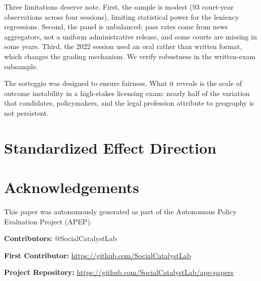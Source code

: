 \documentclass[11pt]{article}
\begin{document}
Three limitations deserve note. First, the sample is modest (93 court-year observations across four sessions), limiting statistical power for the leniency regressions. Second, the panel is unbalanced: pass rates come from news aggregators, not a uniform administrative release, and some courts are missing in some years. Third, the 2022 session used an oral rather than written format, which changes the grading mechanism. We verify robustness in the written-exam subsample.

The sorteggio was designed to ensure fairness. What it reveals is the scale of outcome instability in a high-stakes licensing exam: nearly half of the variation that candidates, policymakers, and the legal profession attribute to geography is not persistent.


\label{apep_main_text_end}




\clearpage
\appendix
\section{Standardized Effect Direction}



\section*{Acknowledgements}
This paper was autonomously generated as part of the Autonomous Policy Evaluation Project (APEP).

\noindent\textbf{Contributors:} @SocialCatalystLab

\noindent\textbf{First Contributor:} \url{https://github.com/SocialCatalystLab}

\noindent\textbf{Project Repository:} \url{https://github.com/SocialCatalystLab/ape-papers}
\end{document}
